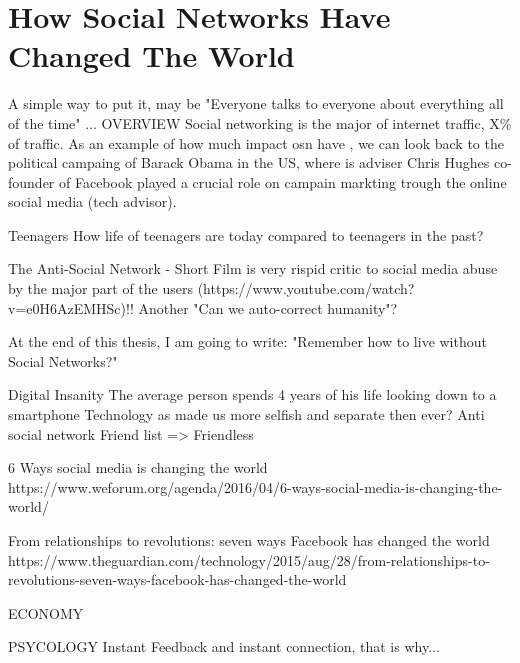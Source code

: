 









\section{How Social Networks Have Changed The World}

A simple way to put it, may be "Everyone talks to everyone about everything all of the time"
...
OVERVIEW
Social networking is the major of internet traffic, X\% of traffic. As an example of how much impact \gls{osn} have , we can look back to the political campaing of Barack Obama in the US, where is adviser Chris Hughes co-founder of Facebook played a crucial role on campain markting trough the online social media (tech advisor).

Teenagers
How life of teenagers are today compared to teenagers in the past?

The Anti-Social Network - Short Film is very rispid critic to social media abuse by the major part of the users (https://www.youtube.com/watch?v=e0H6AzEMHSc)!!
Another "Can we auto-correct humanity"?

At the end of this thesis, I am going to write: "Remember how to live without Social Networks?"

Digital Insanity
The average person spends 4 years of his life looking down to a smartphone
Technology as made us more selfish and separate then ever?
Anti social network
Friend list => Friendless

6 Ways social media is changing the world
https://www.weforum.org/agenda/2016/04/6-ways-social-media-is-changing-the-world/

From relationships to revolutions: seven ways Facebook has changed the world
https://www.theguardian.com/technology/2015/aug/28/from-relationships-to-revolutions-seven-ways-facebook-has-changed-the-world

ECONOMY

PSYCOLOGY
Instant Feedback and instant connection, that is why...


